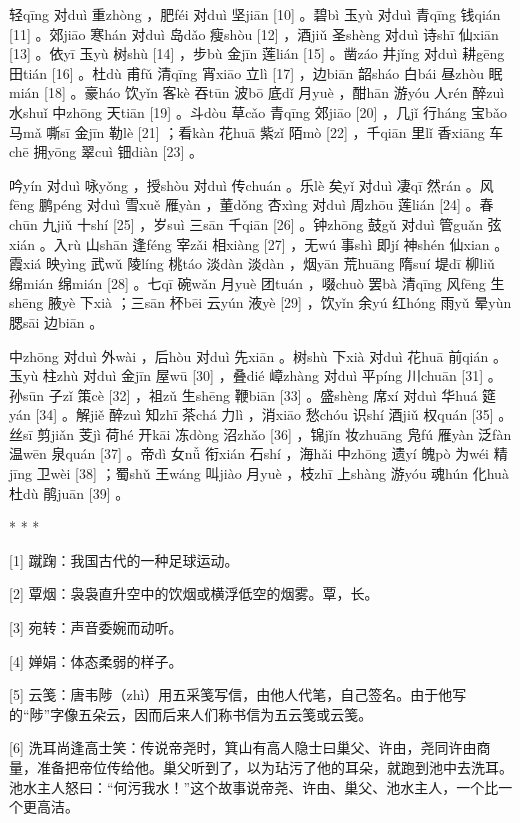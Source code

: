 \documentclass[12pt,UTF8]{ctexbook}
\begin{document}
轻qīng 对duì 重zhòng ，肥féi 对duì 坚jiān [10] 。碧bì 玉yù 对duì 青qīng 钱qián [11] 。郊jiāo 寒hán 对duì 岛dǎo 瘦shòu [12] ，酒jiǔ 圣shèng 对duì 诗shī 仙xiān [13] 。依yī 玉yù 树shù [14] ，步bù 金jīn 莲lián [15] 。凿záo 井jǐng 对duì 耕gēng 田tián [16] 。杜dù 甫fǔ 清qīng 宵xiāo 立lì [17] ，边biān 韶sháo 白bái 昼zhòu 眠mián [18] 。豪háo 饮yǐn 客kè 吞tūn 波bō 底dǐ 月yuè ，酣hān 游yóu 人rén 醉zuì 水shuǐ 中zhōng 天tiān [19] 。斗dòu 草cǎo 青qīng 郊jiāo [20] ，几jǐ 行háng 宝bǎo 马mǎ 嘶sī 金jīn 勒lè [21] ；看kàn 花huā 紫zǐ 陌mò [22] ，千qiān 里lǐ 香xiāng 车chē 拥yōng 翠cuì 钿diàn [23] 。

吟yín 对duì 咏yǒng ，授shòu 对duì 传chuán 。乐lè 矣yǐ 对duì 凄qī 然rán 。风fēng 鹏péng 对duì 雪xuě 雁yàn ，董dǒng 杏xìng 对duì 周zhōu 莲lián [24] 。春chūn 九jiǔ 十shí [25] ，岁suì 三sān 千qiān [26] 。钟zhōng 鼓gǔ 对duì 管guǎn 弦xián 。入rù 山shān 逢féng 宰zǎi 相xiàng [27] ，无wú 事shì 即jí 神shén 仙xian 。霞xiá 映yìng 武wǔ 陵líng 桃táo 淡dàn 淡dàn ，烟yān 荒huāng 隋suí 堤dī 柳liǔ 绵mián 绵mián [28] 。七qī 碗wǎn 月yuè 团tuán ，啜chuò 罢bà 清qīng 风fēng 生shēng 腋yè 下xià ；三sān 杯bēi 云yún 液yè [29] ，饮yǐn 余yú 红hóng 雨yǔ 晕yùn 腮sāi 边biān 。

中zhōng 对duì 外wài ，后hòu 对duì 先xiān 。树shù 下xià 对duì 花huā 前qián 。玉yù 柱zhù 对duì 金jīn 屋wū [30] ，叠dié 嶂zhàng 对duì 平píng 川chuān [31] 。孙sūn 子zǐ 策cè [32] ，祖zǔ 生shēng 鞭biān [33] 。盛shèng 席xí 对duì 华huá 筵yán [34] 。解jiě 醉zuì 知zhī 茶chá 力lì ，消xiāo 愁chóu 识shí 酒jiǔ 权quán [35] 。丝sī 剪jiǎn 芰jì 荷hé 开kāi 冻dòng 沼zhǎo [36] ，锦jǐn 妆zhuāng 凫fú 雁yàn 泛fàn 温wēn 泉quán [37] 。帝dì 女nǚ 衔xián 石shí ，海hǎi 中zhōng 遗yí 魄pò 为wéi 精jīng 卫wèi [38] ；蜀shǔ 王wáng 叫jiào 月yuè ，枝zhī 上shàng 游yóu 魂hún 化huà 杜dù 鹃juān [39] 。



* * *



[1] 蹴踘：我国古代的一种足球运动。

[2] 覃烟：袅袅直升空中的饮烟或横浮低空的烟雾。覃，长。

[3] 宛转：声音委婉而动听。

[4] 婵娟：体态柔弱的样子。

[5] 云笺：唐韦陟（zhì）用五采笺写信，由他人代笔，自己签名。由于他写的“陟”字像五朵云，因而后来人们称书信为五云笺或云笺。

[6] 洗耳尚逢高士笑：传说帝尧时，箕山有高人隐士曰巢父、许由，尧同许由商量，准备把帝位传给他。巢父听到了，以为玷污了他的耳朵，就跑到池中去洗耳。池水主人怒曰：“何污我水！”这个故事说帝尧、许由、巢父、池水主人，一个比一个更高洁。
\end{document}

